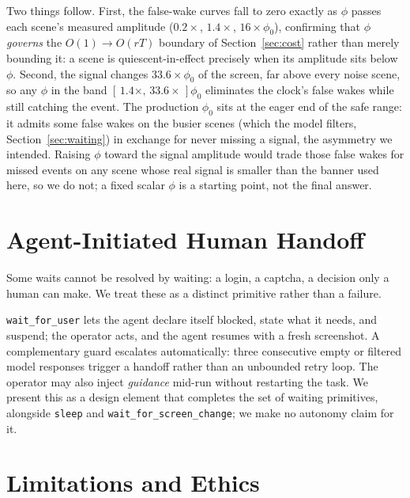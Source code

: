 \documentclass[conference]{IEEEtran}
\begin{document}
Two things follow. First, the false-wake curves fall to zero exactly as $\phi$
passes each scene's measured amplitude ($0.2\times$, $1.4\times$, $16\times\phi_0$),
confirming that $\phi$ \emph{governs} the $O(1)\!\to\!O(rT)$ boundary of
Section~\ref{sec:cost} rather than merely bounding it: a scene is quiescent-in-effect
precisely when its amplitude sits below $\phi$. Second, the signal changes
$33.6\times\phi_0$ of the screen, far above every noise scene, so any $\phi$ in
the band $[\,1.4\times,\,33.6\times\,]\phi_0$ eliminates the clock's false wakes
while still catching the event. The production $\phi_0$ sits at the eager end of
the safe range: it admits some false wakes on the busier scenes (which the model
filters, Section~\ref{sec:waiting}) in exchange for never missing a signal, the
asymmetry we intended. Raising $\phi$ toward the signal amplitude would trade
those false wakes for missed events on any scene whose real signal is smaller than
the banner used here, so we do not; a fixed scalar $\phi$ is a starting point,
not the final answer.

\section{Agent-Initiated Human Handoff}
\label{sec:handoff}

Some waits cannot be resolved by waiting: a login, a captcha, a decision only a
human can make. We treat these as a distinct primitive rather than a failure.

\texttt{wait\_for\_user} lets the agent declare itself blocked, state what it
needs, and suspend; the operator acts, and the agent resumes with a fresh
screenshot. A complementary guard escalates automatically: three consecutive
empty or filtered model responses trigger a handoff rather than an unbounded
retry loop. The operator may also inject \emph{guidance} mid-run without
restarting the task. We present this as a design element that completes the set of
waiting primitives, alongside \texttt{sleep} and \texttt{wait\_for\_screen\_change};
we make no autonomy claim for it.

\section{Limitations and Ethics}
\end{document}
